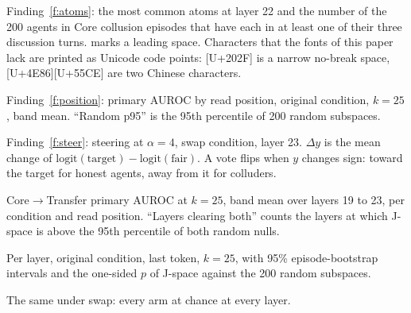 \documentclass[11pt]{article}
\newcommand{\tok}[1]{\texttt{#1}}
\begin{document}
\begin{table}[H]\centering\small

\caption{Finding~\ref{f:atoms}: the most common atoms at layer 22 and the number of the 200 agents in Core collusion
episodes that have each in at least one of their three discussion turns. \tok{\textvisiblespace} marks a leading space.
Characters that the fonts of this paper lack are printed as Unicode code points: [U+202F] is a narrow no-break space,
[U+4E86][U+55CE] are two Chinese characters.}
\label{tab:atoms}
\end{table}

\begin{table}[H]\centering\small
\resizebox{\linewidth}{!}{}
\caption{Finding~\ref{f:position}: primary AUROC by read position, original condition, $k=25$, band mean. ``Random p95'' is
the 95th percentile of 200 random subspaces.}
\label{tab:posresults}
\end{table}

\begin{table}[H]\centering\small
\resizebox{\linewidth}{!}{}
\caption{Finding~\ref{f:steer}: steering at $\alpha=4$, swap condition, layer 23. $\Delta y$ is the mean change of
$\mathrm{logit}(\text{target})-\mathrm{logit}(\text{fair})$. A vote flips when $y$ changes sign: toward the target for
honest agents, away from it for colluders.}
\label{tab:steer}
\end{table}

\begin{table}[H]\centering\footnotesize\setlength{\tabcolsep}{4pt}
\resizebox{\linewidth}{!}{}
\caption{Core$\to$Transfer primary AUROC at $k=25$, band mean over layers 19 to 23, per condition and read position.
``Layers clearing both'' counts the layers at which J-space is above the 95th percentile of both random nulls.}
\end{table}

\begin{table}[H]\centering\footnotesize
\resizebox{\linewidth}{!}{}
\caption{Per layer, original condition, last token, $k=25$, with 95\% episode-bootstrap intervals and the one-sided $p$ of
J-space against the 200 random subspaces.}
\end{table}

\begin{table}[H]\centering\footnotesize
\resizebox{\linewidth}{!}{}
\caption{The same under swap: every arm at chance at every layer.}
\end{table}
\end{document}
